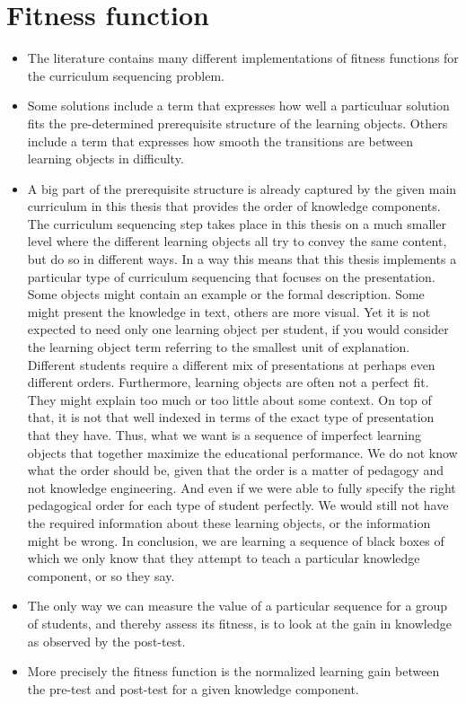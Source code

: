 \section{Fitness function}
\begin{itemize}
	\item The literature contains many different implementations of fitness
		functions for the curriculum sequencing problem. 
	\item Some solutions include a term that expresses how well a particuluar
		solution fits the pre-determined prerequisite structure of the learning
		objects. Others include a term that expresses how smooth the transitions
		are between learning objects in difficulty.
	\item A big part of the prerequisite structure is already captured by the
		given main curriculum in this thesis that provides the order of
		knowledge components. The curriculum sequencing step takes place
		in this thesis on a much smaller level where the different learning
		objects all try to convey the same content, but do so in different
		ways. In a way this means that this thesis implements a particular type
		of curriculum sequencing that focuses on the presentation. Some objects
		might contain an example or the formal description. Some might present
		the knowledge in text, others are more visual. Yet it is not expected
		to need only one learning object per student, if you would consider
		the learning object term referring to the smallest unit of explanation.
		Different students require a different mix of presentations at perhaps
		even different orders. Furthermore, learning objects are often not
		a perfect fit. They might explain too much or too little about some
		context. On top of that, it is not that well indexed in terms of the
		exact type of presentation that they have. Thus, what we want is a
		sequence of imperfect learning objects that together maximize the
		educational performance. We do not know what the order should be, given
		that the order is a matter of pedagogy and not knowledge engineering.
		And even if we were able to fully specify the right pedagogical order
		for each type of student perfectly. We would still not have the
		required information about these learning objects, or the information
		might be wrong. In conclusion, we are learning a sequence of black
		boxes of which we only know that they attempt to teach a particular
		knowledge component, or so they say.
	\item The only way we can measure the value of a particular sequence for a
		group of students, and thereby assess its fitness, is to look at the
		gain in knowledge as observed by the post-test.
	\item More precisely the fitness function is the normalized learning gain
		between the pre-test and post-test for a given knowledge component.
\end{itemize}
